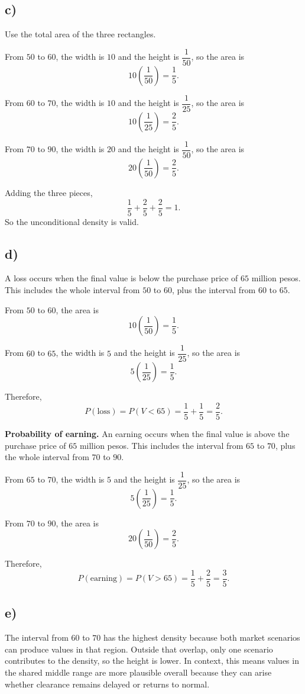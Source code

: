 \subsection*{c)}
Use the total area of the three rectangles.

From $50$ to $60$, the width is $10$ and the height is $\dfrac{1}{50}$, so the area is
\[
10\left(\frac{1}{50}\right)=\frac{1}{5}.
\]

From $60$ to $70$, the width is $10$ and the height is $\dfrac{1}{25}$, so the area is
\[
10\left(\frac{1}{25}\right)=\frac{2}{5}.
\]

From $70$ to $90$, the width is $20$ and the height is $\dfrac{1}{50}$, so the area is
\[
20\left(\frac{1}{50}\right)=\frac{2}{5}.
\]

Adding the three pieces,
\[
\frac{1}{5}+\frac{2}{5}+\frac{2}{5}=1.
\]
So the unconditional density is valid.

\subsection*{d)}
A loss occurs when the final value is below the purchase price of $65$ million pesos. This includes the whole interval from $50$ to $60$, plus the interval from $60$ to $65$.

From $50$ to $60$, the area is
\[
10\left(\frac{1}{50}\right)=\frac{1}{5}.
\]

From $60$ to $65$, the width is $5$ and the height is $\dfrac{1}{25}$, so the area is
\[
5\left(\frac{1}{25}\right)=\frac{1}{5}.
\]

Therefore,
\[
P(\text{loss})=P(V<65)=\frac{1}{5}+\frac{1}{5}=\frac{2}{5}.
\]

\textbf{Probability of earning.}
An earning occurs when the final value is above the purchase price of $65$ million pesos. This includes the interval from $65$ to $70$, plus the whole interval from $70$ to $90$.

From $65$ to $70$, the width is $5$ and the height is $\dfrac{1}{25}$, so the area is
\[
5\left(\frac{1}{25}\right)=\frac{1}{5}.
\]

From $70$ to $90$, the area is
\[
20\left(\frac{1}{50}\right)=\frac{2}{5}.
\]

Therefore,
\[
P(\text{earning})=P(V>65)=\frac{1}{5}+\frac{2}{5}=\frac{3}{5}.
\]

\subsection*{e)}
The interval from $60$ to $70$ has the highest density because both market scenarios can produce values in that region. Outside that overlap, only one scenario contributes to the density, so the height is lower. In context, this means values in the shared middle range are more plausible overall because they can arise whether clearance remains delayed or returns to normal.

